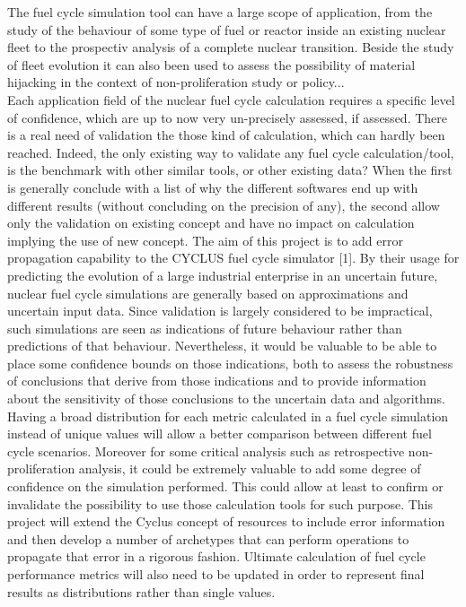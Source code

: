 \documentclass[dvips,12pt]{article}
\begin{document}
The fuel cycle simulation tool can have a large scope of application, from the study of the behaviour of some type of fuel or reactor inside an existing nuclear fleet to the prospectiv analysis of a complete nuclear transition. Beside the study of fleet evolution it can also been used to assess the possibility of material hijacking in the context of non-proliferation study or policy...\\
Each application field of the nuclear fuel cycle calculation requires a specific level of confidence, which are up to now very un-precisely assessed, if assessed. There is a real need of validation the those kind of calculation, which can hardly been reached. Indeed, the only existing way to validate any fuel cycle calculation/tool, is the benchmark with other similar tools, or other existing data? When the first is generally conclude with a list of why the different softwares end up with different results (without concluding on the precision of any), the second allow only the validation on existing concept and have no impact on calculation implying the use of new concept. 
The aim of this project is to add error propagation capability to the CYCLUS fuel cycle simulator [1]. By their usage for predicting the evolution of a large industrial enterprise in an uncertain future, nuclear fuel cycle simulations are generally based on approximations and uncertain input data.  Since validation is largely considered to be impractical, such simulations are seen as indications of future behaviour rather than predictions of that behaviour.  
Nevertheless, it would be valuable to be able to place some confidence bounds on those indications, both to assess the robustness of conclusions that derive from those indications and to provide information about the sensitivity of those conclusions to the uncertain data and algorithms. 
Having a broad distribution for each metric calculated in a fuel cycle simulation instead of unique values will allow a better comparison between different fuel cycle scenarios.
Moreover for some critical analysis such as retrospective non-proliferation analysis, it could be extremely valuable to add some degree of confidence on the simulation performed. This could allow at least to confirm or invalidate the possibility to use those calculation tools for such purpose.
This project will extend the Cyclus concept of resources to include error information and then develop a number of archetypes that can perform operations to propagate that error in a rigorous fashion.  Ultimate calculation of fuel cycle performance metrics will also need to be updated in order to represent final results as distributions rather than single values. 
\end{document}
